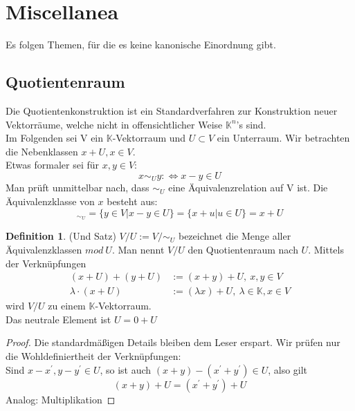 \documentclass[12pt,a4paper]{article}
\theoremstyle{definition}
\newtheorem{definition}[theorem]{Definition}
\theoremstyle{remark}
\begin{document}
	\section{Miscellanea}
	Es folgen Themen, für die es keine kanonische Einordnung gibt. 
	\subsection{Quotientenraum}
	Die Quotientenkonstruktion ist ein Standardverfahren zur Konstruktion neuer Vektorräume, welche nicht in offensichtlicher Weise $\mathbb{K}^n$'s sind. \\
	Im Folgenden sei V ein $\mathbb{K}$-Vektorraum und $U \subset V$ ein Unterraum. Wir betrachten die Nebenklassen $x+U, x \in V$. \\
	Etwas formaler sei für $x,y \in V$:
	\begin{equation}
		x \sim_{U} y: \Leftrightarrow x-y \in U
	\end{equation}
	Man prüft unmittelbar nach, dass $\sim_U$ eine Äquivalenzrelation auf V ist. Die Äquivalenzklasse von $x$ besteht aus:
	\begin{equation}
		[x]_{\sim_U} = \{ y \in V | x-y \in U \} = \{ x+u | u \in U \}=x+U
	\end{equation}
	\begin{definition}{(Und Satz)}
		$V/U:=V/\sim_U$ bezeichnet die Menge aller Äquivalenzklassen $mod \ U$. Man nennt $V/U$ den Quotientenraum nach $U$. Mittels der Verknüpfungen
		\begin{equation}
			\begin{split}
				(x+U)+(y+U) &:= (x+y)+U, \ x,y \in V \\
				\lambda \cdot (x+U) &:= (\lambda x)+U, \ \lambda \in \mathbb{K}, x \in V
			\end{split}
		\end{equation}
		wird $V/U$ zu einem $\mathbb{K}$-Vektorraum. \\
		Das neutrale Element ist $U = 0 + U$
	\end{definition}
	\begin{proof}
		Die standardmäßigen Details bleiben dem Leser erspart. Wir prüfen nur die Wohldefiniertheit der Verknüpfungen: \\
		Sind $x-x^{'}, y - y^{'} \in U$, so ist auch $(x+y)-(x^{'}+y^{'}) \in U$, also
		gilt 
		\begin{equation}
			(x+y) + U = (x^{'}+y^{'})+U
		\end{equation}
		Analog: Multiplikation
	\end{proof}
\end{document}
